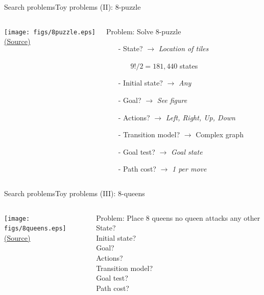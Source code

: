 \documentclass[10pt,compress]{beamer} %
\begin{document}
\begin{frame}{Search problems}{Toy problems (II): 8-puzzle}
       \begin{columns}
	            \centering \texttt{[image: figs/8puzzle.eps]}\\
	            \tiny{\href{http://aima.cs.berkeley.edu/index.html}{(Source)}}
                \begin{exampleblock}{Problem: Solve 8-puzzle}
                    \begin{itemize}
                    \item[-] State? $\rightarrow$ \textit{Location of tiles}
                        \begin{itemize}
                            \item[] $9!/2 = 181,440$ states
                        \end{itemize}
                    \item[-] Initial state? $\rightarrow$ \textit{Any}
                    \item[-] Goal? $\rightarrow$ \textit{See figure}
                    \item[-] Actions? $\rightarrow$ \textit{Left, Right, Up, Down}
                    \item[-] Transition model? $\rightarrow$ Complex graph
                    \item[-] Goal test? $\rightarrow$ \textit{Goal state}
                    \item[-] Path cost? $\rightarrow$ \textit{1 per move}
                    \end{itemize}
                \end{exampleblock}

      \end{columns}
\end{frame}

\begin{frame}{Search problems}{Toy problems (III): 8-queens}
       \begin{columns}
	            \centering \texttt{[image: figs/8queens.eps]}\\
	            \tiny{\href{http://aima.cs.berkeley.edu/index.html}{(Source)}}
                \begin{exampleblock}{Problem: Place 8 queens no queen attacks any other}
                State?\\
                Initial state? \\
                Goal? \\
                Actions? \\ 
                Transition model? \\
                Goal test? \\
                Path cost?\\
                \end{exampleblock}
      \end{columns}
\end{frame}
\end{document}
